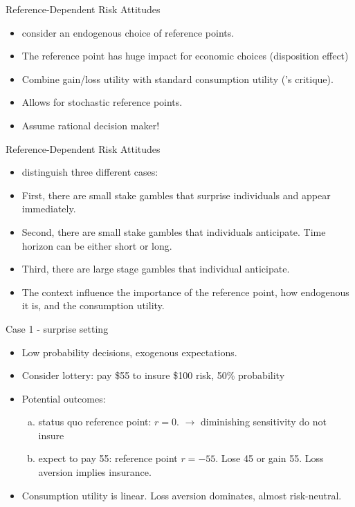 \begin{frame}{Reference-Dependent Risk Attitudes}
    \begin{itemize}
         \item \citet{KoeszegiRabin2007} consider an endogenous choice of reference points.\medskip
        \item The reference point has huge impact for economic choices (disposition effect)\medskip
        \item Combine gain/loss utility with standard consumption utility (\citet{Rabin2000}'s critique).\medskip
            \item Allows for stochastic reference points.\medskip
            \item Assume rational decision maker!\medskip
        \end{itemize}
\end{frame}

\begin{frame}{Reference-Dependent Risk Attitudes}
    \begin{itemize}
            \item \citet{KoeszegiRabin2007} distinguish three different cases:\medskip
            \item First, there are small stake gambles that surprise individuals and appear immediately.\medskip
            \item Second, there are small stake gambles that individuals anticipate. Time horizon can be either short or long.\medskip
           \item Third, there are large stage gambles that individual anticipate.\medskip
           \item The context influence the importance of the reference point, how endogenous it is, and the consumption utility.\medskip
                    \end{itemize}
\end{frame}

\begin{frame}{Case 1 - surprise setting}
    \begin{itemize}
        \item Low probability decisions, exogenous expectations.\medskip
        \item Consider lottery: pay \$55 to insure \$100 risk, 50\% probability\medskip
        \item Potential outcomes:\medskip
        \begin{enumerate}[(a)]
            \item status quo reference point: $r = 0$. $\rightarrow$ diminishing sensitivity do not insure\medskip
            \item expect to pay 55: reference point $r = -55$. Lose 45  or gain 55. Loss aversion implies  insurance.\medskip
        \end{enumerate}
        \item Consumption utility is linear. Loss aversion dominates, almost risk-neutral.\medskip
        \end{itemize}
   \end{frame}

